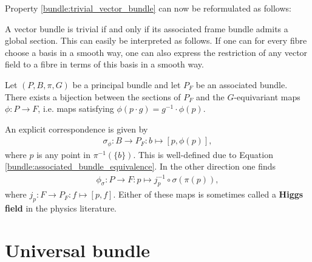     Property \ref{bundle:trivial_vector_bundle} can now be reformulated as follows:
    \begin{property}
        A vector bundle is trivial if and only if its associated frame bundle admits a global section. This can easily be interpreted as follows. If one can for every fibre choose a basis in a smooth way, one can also express the restriction of any vector field to a fibre in terms of this basis in a smooth way.
    \end{property}

    \begin{property}\label{bundle:section_bijection}
        Let $(P,B,\pi,G)$ be a principal bundle and let $P_F$ be an associated bundle. There exists a bijection between the sections of $P_F$ and the $G$-equivariant maps $\phi:P\rightarrow F$, i.e. maps satisfying $\phi(p\cdot g) = g^{-1}\cdot\phi(p)$.

        An explicit correspondence is given by
        \begin{gather}
            \sigma_\phi:B\rightarrow P_F:b\mapsto[p,\phi(p)],
        \end{gather}
        where $p$ is any point in $\pi^{-1}(\{b\})$. This is well-defined due to Equation \eqref{bundle:associated_bundle_equivalence}. In the other direction one finds
        \begin{gather}
            \label{bundle:section_bijection_phi}
            \phi_\sigma:P\rightarrow F:p\mapsto j_p^{-1}\circ\sigma(\pi(p)),
        \end{gather}
        where $j_p:F\rightarrow P_F:f\mapsto[p,f]$. Either of these maps is sometimes called a \textbf{Higgs field} in the physics literature.
    \end{property}

\section{Universal bundle}

